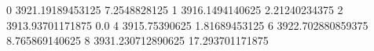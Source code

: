 0 3921.19189453125 7.2548828125
1 3916.1494140625 2.21240234375
2 3913.93701171875 0.0
4 3915.75390625 1.81689453125
6 3922.702880859375 8.765869140625
8 3931.230712890625 17.293701171875

